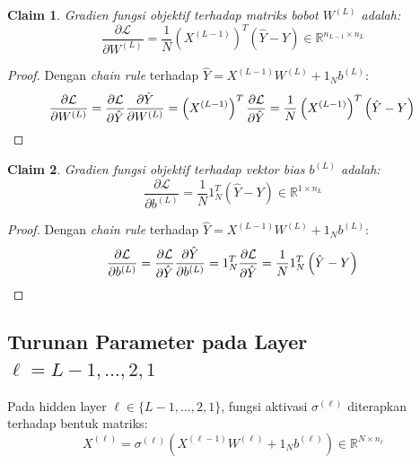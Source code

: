 \documentclass[11pt,a4paper]{article}
\def\mathbf#1{#1}%
\theoremstyle{plain}
\newtheorem{claim}{Claim}[section]
\theoremstyle{definition}
\theoremstyle{remark}
\begin{document}
\begin{claim}
Gradien fungsi objektif terhadap matriks bobot $W^{(L)}$ adalah:
\begin{equation}
    \frac{\partial \mathcal{L}}{\partial W^{(L)}} = \frac{1}{N} \left( X^{(L-1)} \right)^T \left( \hat{Y} - Y \right) \in \mathbb{R}^{n_{L-1} \times n_L} \label{eq:claim_grad_W_L}
\end{equation}
\end{claim}
\begin{proof}
Dengan \textit{chain rule} terhadap $\hat{Y} = X^{(L-1)} W^{(L)} + \mathbf{1}_N \mathbf{b}^{(L)}$:
\begin{equation}
    \frac{\partial \mathcal{L}}{\partial W^{(L)}} = \frac{\partial \mathcal{L}}{\partial \hat{Y}} \frac{\partial \hat{Y}}{\partial W^{(L)}} = \left( X^{(L-1)} \right)^T \frac{\partial \mathcal{L}}{\partial \hat{Y}} = \frac{1}{N} \left( X^{(L-1)} \right)^T \left( \hat{Y} - Y \right) \qedhere
\end{equation}
\end{proof}

\begin{claim}
Gradien fungsi objektif terhadap vektor bias $\mathbf{b}^{(L)}$ adalah:
\begin{equation}
    \frac{\partial \mathcal{L}}{\partial \mathbf{b}^{(L)}} = \frac{1}{N} \mathbf{1}_N^T \left( \hat{Y} - Y \right) \in \mathbb{R}^{1 \times n_L} \label{eq:claim_grad_b_L}
\end{equation}
\end{claim}
\begin{proof}
Dengan \textit{chain rule} terhadap $\hat{Y} = X^{(L-1)} W^{(L)} + \mathbf{1}_N \mathbf{b}^{(L)}$:
\begin{equation}
    \frac{\partial \mathcal{L}}{\partial \mathbf{b}^{(L)}} = \frac{\partial \mathcal{L}}{\partial \hat{Y}} \frac{\partial \hat{Y}}{\partial \mathbf{b}^{(L)}} = \mathbf{1}_N^T \frac{\partial \mathcal{L}}{\partial \hat{Y}} = \frac{1}{N} \mathbf{1}_N^T \left( \hat{Y} - Y \right) \qedhere
\end{equation}
\end{proof}

\clearpage
\subsection{Turunan Parameter pada Layer \texorpdfstring{$\ell = L-1, \dots, 2, 1$}{l = L-1, ..., 2, 1}}
\label{subsec:gradien_layer_hidden}

Pada hidden layer $\ell \in \{L-1, \dots, 2, 1\}$, fungsi aktivasi $\sigma^{(\ell)}$ diterapkan terhadap bentuk matriks:
\begin{equation}
    X^{(\ell)} = \sigma^{(\ell)}\left( X^{(\ell-1)} W^{(\ell)} + \mathbf{1}_N \mathbf{b}^{(\ell)} \right) \in \mathbb{R}^{N \times n_\ell} \label{eq:X_hidden_matrix}
\end{equation}
\end{document}
